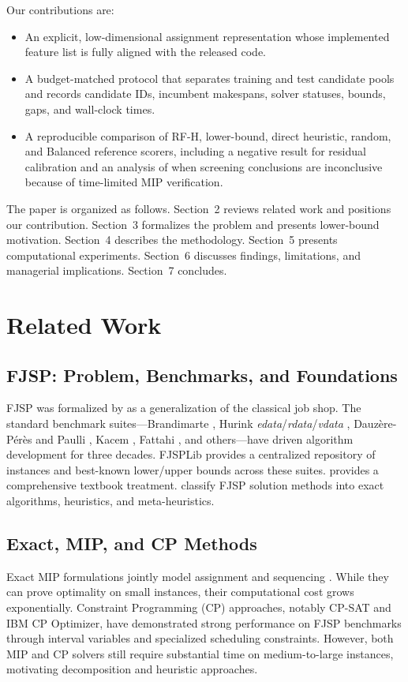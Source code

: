 \documentclass[12pt]{article}
\begin{document}
Our contributions are:
\begin{itemize}[leftmargin=1.2em]
\item An explicit, low-dimensional assignment representation whose implemented feature list is fully aligned with the released code.
\item A budget-matched protocol that separates training and test candidate pools and records candidate IDs, incumbent makespans, solver statuses, bounds, gaps, and wall-clock times.
\item A reproducible comparison of RF-H, lower-bound, direct heuristic, random, and Balanced reference scorers, including a negative result for residual calibration and an analysis of when screening conclusions are inconclusive because of time-limited MIP verification.
\end{itemize}

The paper is organized as follows. Section~2 reviews related work and positions our contribution. Section~3 formalizes the problem and presents lower-bound motivation. Section~4 describes the methodology. Section~5 presents computational experiments. Section~6 discusses findings, limitations, and managerial implications. Section~7 concludes.

\section{Related Work}

\subsection{FJSP: Problem, Benchmarks, and Foundations}
FJSP was formalized by \citet{Brucker1990} as a generalization of the classical job shop. The standard benchmark suites---Brandimarte \citep{Brandimarte1993}, Hurink \textit{edata}/\textit{rdata}/\textit{vdata} \citep{Hurink1994}, Dauz\`ere-P\'er\`es and Paulli \citep{Dauzere1997}, Kacem \citep{Kacem2002}, Fattahi \citep{Fattahi2007}, and others---have driven algorithm development for three decades. FJSPLib provides a centralized repository of instances and best-known lower/upper bounds across these suites. \citet{Pinedo2016} provides a comprehensive textbook treatment. \citet{Xie2019} classify FJSP solution methods into exact algorithms, heuristics, and meta-heuristics.

\subsection{Exact, MIP, and CP Methods}
Exact MIP formulations jointly model assignment and sequencing \citep{Ozguven2010,Meng2020}. While they can prove optimality on small instances, their computational cost grows exponentially. Constraint Programming (CP) approaches, notably CP-SAT and IBM CP Optimizer, have demonstrated strong performance on FJSP benchmarks through interval variables and specialized scheduling constraints. However, both MIP and CP solvers still require substantial time on medium-to-large instances, motivating decomposition and heuristic approaches.
\end{document}
